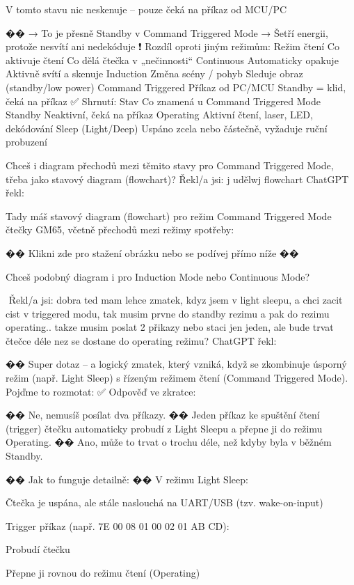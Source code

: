     V tomto stavu nic neskenuje – pouze čeká na příkaz od MCU/PC

�� → To je přesně Standby v Command Triggered Mode
→ Šetří energii, protože nesvítí ani nedekóduje
❗ Rozdíl oproti jiným režimům:
Režim čtení	Co aktivuje čtení	Co dělá čtečka v „nečinnosti“
Continuous	Automaticky opakuje	Aktivně svítí a skenuje
Induction	Změna scény / pohyb	Sleduje obraz (standby/low power)
Command Triggered	Příkaz od PC/MCU	Standby = klid, čeká na příkaz
✅ Shrnutí:
Stav	Co znamená u Command Triggered Mode
Standby	Neaktivní, čeká na příkaz
Operating	Aktivní čtení, laser, LED, dekódování
Sleep (Light/Deep)	Uspáno zcela nebo částečně, vyžaduje ruční probuzení

Chceš i diagram přechodů mezi těmito stavy pro Command Triggered Mode, třeba jako stavový diagram (flowchart)?
Řekl/a jsi:
j udělwj flowchart
ChatGPT řekl:

Tady máš stavový diagram (flowchart) pro režim Command Triggered Mode čtečky GM65, včetně přechodů mezi režimy spotřeby:

�� Klikni zde pro stažení obrázku
nebo se podívej přímo níže ��

Chceš podobný diagram i pro Induction Mode nebo Continuous Mode? ​

​
Řekl/a jsi:
dobra ted mam lehce zmatek, kdyz jsem v light sleepu, a chci zacit cist v triggered modu, tak musim prvne do standby rezimu a pak do rezimu operating.. takze musim poslat 2 přikazy nebo staci jen jeden, ale bude trvat čtečce déle nez se dostane do operating režimu?
ChatGPT řekl:

�� Super dotaz – a logický zmatek, který vzniká, když se zkombinuje úsporný režim (např. Light Sleep) s řízeným režimem čtení (Command Triggered Mode). Pojďme to rozmotat:
✅ Odpověď ve zkratce:

    �� Ne, nemusíš posílat dva příkazy.
    �� Jeden příkaz ke spuštění čtení (trigger) čtečku automaticky probudí z Light Sleepu a přepne ji do režimu Operating.
    �� Ano, může to trvat o trochu déle, než kdyby byla v běžném Standby.

�� Jak to funguje detailně:
�� V režimu Light Sleep:

    Čtečka je uspána, ale stále naslouchá na UART/USB (tzv. wake-on-input)

    Trigger příkaz (např. 7E 00 08 01 00 02 01 AB CD):

        Probudí čtečku

        Přepne ji rovnou do režimu čtení (Operating)


